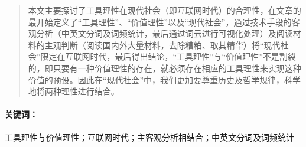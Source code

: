\begin{abstract}
    本文主要探讨了工具理性在现代社会（即互联网时代）的合理性，在文章的最开始定义了“工具理性”、“价值理性”以及“现代社会”，通过技术手段的客观分析（中英文分词及词频统计，最后通过词云进行可视化处理）及阅读材料的主观判断（阅读国内外大量材料，去除糟粕、取其精华）将“现代社会”限定在互联网时代，最后得出结论，“工具理性”与“价值理性”不是割裂的，即只要有一种价值理性的存在，就必须存在相应的工具理性来实现这种价值的预设。因此在“现代社会”中，我们更加要尊重历史及哲学规律，科学地将两种理性进行结合。
\end{abstract}

\paragraph{关键词：} 工具理性与价值理性；互联网时代；主客观分析相结合；中英文分词及词频统计
